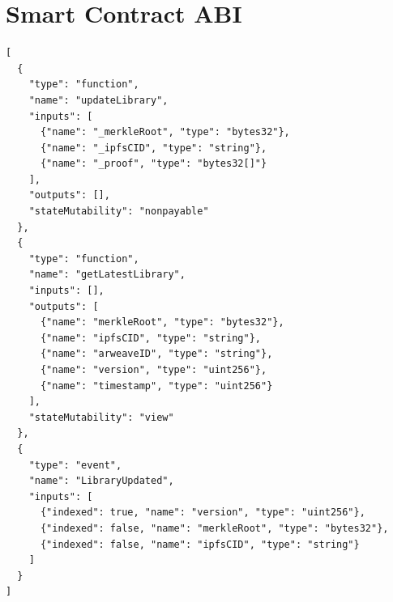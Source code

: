 \section{Smart Contract ABI}


\begin{lstlisting}[caption=Experience Registry ABI (Simplified)]
[
  {
    "type": "function",
    "name": "updateLibrary",
    "inputs": [
      {"name": "_merkleRoot", "type": "bytes32"},
      {"name": "_ipfsCID", "type": "string"},
      {"name": "_proof", "type": "bytes32[]"}
    ],
    "outputs": [],
    "stateMutability": "nonpayable"
  },
  {
    "type": "function",
    "name": "getLatestLibrary",
    "inputs": [],
    "outputs": [
      {"name": "merkleRoot", "type": "bytes32"},
      {"name": "ipfsCID", "type": "string"},
      {"name": "arweaveID", "type": "string"},
      {"name": "version", "type": "uint256"},
      {"name": "timestamp", "type": "uint256"}
    ],
    "stateMutability": "view"
  },
  {
    "type": "event",
    "name": "LibraryUpdated",
    "inputs": [
      {"indexed": true, "name": "version", "type": "uint256"},
      {"indexed": false, "name": "merkleRoot", "type": "bytes32"},
      {"indexed": false, "name": "ipfsCID", "type": "string"}
    ]
  }
]
\end{lstlisting}


